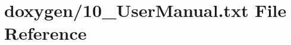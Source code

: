 \hypertarget{10__UserManual_8txt}{\section{doxygen/10\+\_\+\+User\+Manual.txt File Reference}
\label{10__UserManual_8txt}
}
